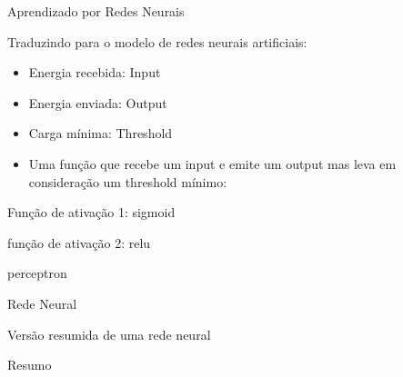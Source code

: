 \documentclass[10pt]{beamer}
\begin{document}
\begin{frame}{Aprendizado por Redes Neurais}

Traduzindo para o modelo de redes neurais artificiais:
\begin{itemize}
\item Energia recebida: \alert{Input}
\item  Energia enviada: \alert{Output}
\item Carga mínima: \alert{Threshold}
\item Uma função que recebe um input e emite um output mas leva em consideração um threshold mínimo: 

\end{itemize}

\end{frame}



\begin{frame}{Função de ativação 1: sigmoid}

\end{frame}

\begin{frame}{função de ativação 2: relu}

\end{frame}

\begin{frame}[fragile]{perceptron}

\end{frame}



\begin{frame}[fragile]{Rede Neural}

\end{frame}

\begin{frame}[fragile]{Versão resumida de uma rede neural}

\end{frame}

\begin{frame}{Resumo}

\end{frame}
\end{document}

